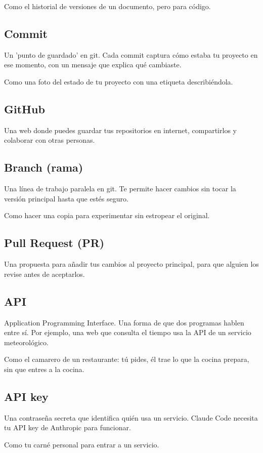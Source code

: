 \documentclass[11pt,a4paper]{book}
\begin{document}
Como el historial de versiones de un documento, pero para código.

\subsection{Commit}
Un 'punto de guardado' en git. Cada commit captura cómo estaba tu proyecto en ese momento, con un mensaje que explica qué cambiaste.

Como una foto del estado de tu proyecto con una etiqueta describiéndola.

\subsection{GitHub}
Una web donde puedes guardar tus repositorios en internet, compartirlos y colaborar con otras personas.

\subsection{Branch (rama)}
Una línea de trabajo paralela en git. Te permite hacer cambios sin tocar la versión principal hasta que estés seguro.

Como hacer una copia para experimentar sin estropear el original.

\subsection{Pull Request (PR)}
Una propuesta para añadir tus cambios al proyecto principal, para que alguien los revise antes de aceptarlos.

\subsection{API}
Application Programming Interface. Una forma de que dos programas hablen entre sí. Por ejemplo, una web que consulta el tiempo usa la API de un servicio meteorológico.

Como el camarero de un restaurante: tú pides, él trae lo que la cocina prepara, sin que entres a la cocina.

\subsection{API key}
Una contraseña secreta que identifica quién usa un servicio. Claude Code necesita tu API key de Anthropic para funcionar.

Como tu carné personal para entrar a un servicio.
\end{document}
